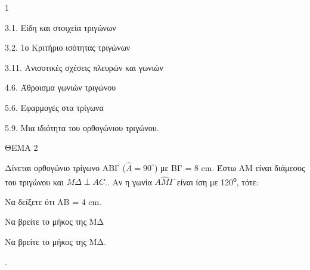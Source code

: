 \begin{ylh}{1}
    \item 3.1. Είδη και στοιχεία τριγώνων
    \item 3.2. 1ο Κριτήριο ισότητας τριγώνων
    \item 3.11. Ανισοτικές σχέσεις πλευρών και γωνιών
    \item 4.6. Άθροισμα γωνιών τριγώνου
    \item 5.6. Εφαρμογές στα τρίγωνα
    \item 5.9. Μια ιδιότητα του ορθογώνιου τριγώνου.
\end{ylh}

ΘΕΜΑ 2

Δίνεται ορθογώνιο τρίγωνο ΑΒΓ ($\widehat{A}=90^{\circ}$) με ΒΓ = 8 cm. Έστω ΑΜ είναι διάμεσος του τριγώνου και 
$M\Delta \perp AC$.. Αν η γωνία 
$A\widehat{M}\Gamma$ είναι ίση με 120\textsuperscript{ο}, τότε:

\begin{alist}
\item Να δείξετε ότι ΑΒ = 4 cm. 

\item Να βρείτε το μήκος της ΜΔ
\item Να βρείτε το μήκος της ΜΔ.

\begin{center}
\end{center}
. 
\end{alist}
